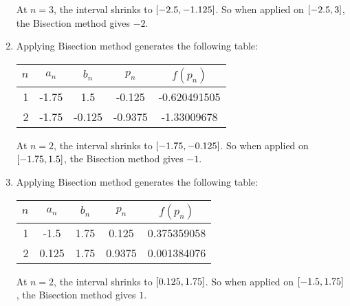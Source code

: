 \documentclass[../../Assignments.tex]{subfiles}
\begin{document}
\begin{solution}
\begin{enumerate}[label = (\alph*)]
            At \(n = 3\), the interval shrinks to
            \(\interval{\num{-2.5}}{\num{-1.125}}\). So when applied on
            \(\interval{\num{-2.5}}{3}\), the Bisection method gives \(-2\).

        \item Applying Bisection method generates the following table:

            \begin{table}[H]
                \centering
                \begin{tabular}{r S[table-format=-1.2] S[table-format=-1.3] S[table-format=-1.4] S[table-format=-1.9]}
                    \toprule
                    \(n\)  &   {\(a_n\)}   &   {\(b_n\)}   &   {\(p_n\)}   &  {\(f(p_n)\)}  \\
                     &  -1.75        &   1.5         &  -0.125       & -0.620491505    \\
                         2 &  -1.75        &  -0.125       &  -0.9375      & -1.33009678     \\
                    \bottomrule
                \end{tabular}
            \end{table}

            At \(n = 2\), the interval shrinks to
            \(\interval{\num{-1.75}}{\num{-0.125}}\). So when applied on
            \(\interval{\num{-1.75}}{\num{1.5}}\), the Bisection method gives
            \(-1\).

        \item Applying Bisection method generates the following table:

            \begin{table}[H]
                \centering
                \begin{tabular}{r S[table-format=-1.3] S[table-format=1.2] S[table-format=1.4] S[table-format=1.9]}
                    \toprule
                    \(n\)  &   {\(a_n\)}   &   {\(b_n\)}   &   {\(p_n\)}   &  {\(f(p_n)\)}  \\
                      &  -1.5         & 1.75          &  0.125        &  0.375359058   \\
                        2  &   0.125       & 1.75          &  0.9375       &  0.001384076   \\
                    \bottomrule
                \end{tabular}
            \end{table}

            At \(n = 2\), the interval shrinks to
            \(\interval{\num{0.125}}{\num{1.75}}\). So when applied on
            \(\interval{\num{-1.5}}{\num{1.75}}\), the Bisection method gives
            \(1\).
    \end{enumerate}
\end{solution}
\end{document}
